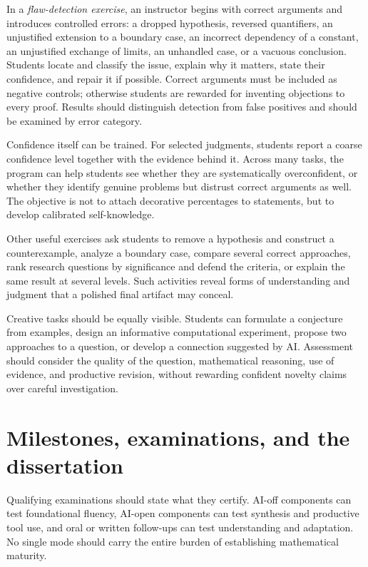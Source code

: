 \documentclass[11pt]{article}
\newcommand{\term}[1]{\emph{#1}}
\begin{document}
In a \term{flaw-detection exercise}, an instructor begins with correct arguments and
introduces controlled errors: a dropped hypothesis, reversed quantifiers, an unjustified
extension to a boundary case, an incorrect dependency of a constant, an unjustified exchange of limits, an
unhandled case, or a vacuous conclusion.  Students locate and classify the issue, explain
why it matters, state their confidence, and repair it if possible.  Correct arguments
must be included as negative controls; otherwise students are rewarded for inventing
objections to every proof.  Results should distinguish detection from false positives and
should be examined by error category.

Confidence itself can be trained.  For selected judgments, students report a coarse
confidence level together with the evidence behind it.  Across many tasks, the program
can help students see whether they are systematically overconfident, or whether they
identify genuine problems but distrust correct arguments as well.  The objective is not
to attach decorative percentages to statements, but to develop calibrated self-knowledge.

Other useful exercises ask students to remove a hypothesis and construct a counterexample,
analyze a boundary case, compare several correct approaches, rank research questions by
significance and defend the criteria, or explain the same result at several levels.  Such
activities reveal forms of understanding and judgment that a polished final artifact may
conceal.

Creative tasks should be equally visible. Students can formulate a conjecture from
examples, design an informative computational experiment, propose two approaches to a
question, or develop a connection suggested by AI. Assessment should consider the
quality of the question, mathematical reasoning, use of evidence, and productive
revision, without rewarding confident novelty claims over careful investigation.

\section{Milestones, examinations, and the dissertation}
\label{sec:milestones}

Qualifying examinations should state what they certify. AI-off components can test
foundational fluency, AI-open components can test synthesis and productive tool use,
and oral or written follow-ups can test understanding and adaptation. No single mode
should carry the entire burden of establishing mathematical maturity.
\end{document}
